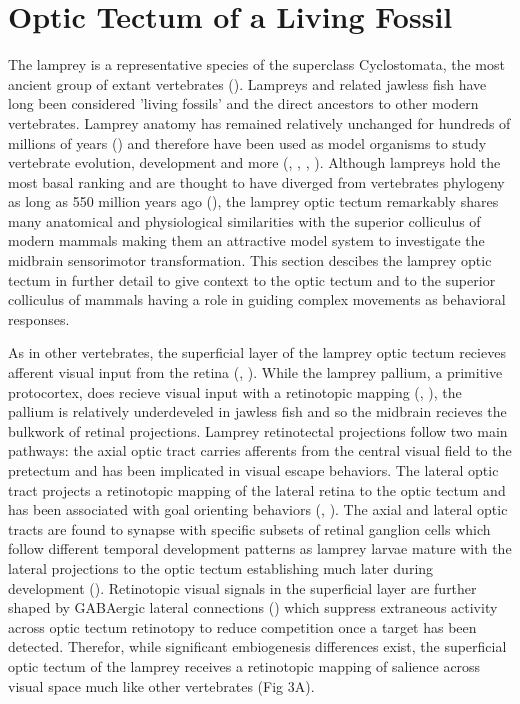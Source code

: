 \documentclass{ar-1col}
\begin{document}
{\section{Optic Tectum of a Living Fossil}
The lamprey is a representative species of the superclass Cyclostomata, the most ancient group of extant vertebrates (\cite{yang2016lamprey}). Lampreys and related jawless fish have long been considered 'living fossils' and the direct ancestors to other modern vertebrates. Lamprey anatomy has remained relatively unchanged for hundreds of millions of years (\cite{gess2006lamprey}) and therefore have been used as model organisms to study vertebrate evolution, development and more (\cite{nikitina2009sea}, \cite{green2014lamprey}, \cite{mccauley2015lampreys}, \cite{yang2016lamprey}). Although lampreys hold the most basal ranking and are thought to have diverged from vertebrates phylogeny as long as 550 million years ago (\cite{kumar1998molecular}), the lamprey optic tectum remarkably shares many anatomical and physiological similarities with the superior colliculus of modern mammals making them an attractive model system to investigate the midbrain sensorimotor transformation. This section descibes the lamprey optic tectum in further detail to give context to the optic tectum and to the superior colliculus of mammals having a role in guiding complex movements as behavioral responses.

As in other vertebrates, the superficial layer of the lamprey optic tectum recieves afferent visual input from the retina (\cite{kosareva1980retinal}, \cite{kennedy1977retinal}). While the lamprey pallium, a primitive protocortex, does recieve visual input with a retinotopic mapping (\cite{suryanarayana2017lamprey}, \cite{suryanarayana2020evolutionary}), the pallium is relatively underdeveled in jawless fish and so the midbrain recieves the bulkwork of retinal projections. Lamprey retinotectal projections follow two main pathways: the axial optic tract carries afferents from the central visual field to the pretectum and has been implicated in visual escape behaviors. The lateral optic tract projects a retinotopic mapping of the lateral retina to the optic tectum and has been associated with goal orienting behaviors (\cite{jones2009selective}, \cite{cornide2011retinotopy}). The axial and lateral optic tracts are found to synapse with specific subsets of retinal ganglion cells which follow different temporal development patterns as lamprey larvae mature with the lateral projections to the optic tectum establishing much later during development (\cite{cornide2011retinotopy}). Retinotopic visual signals in the superficial layer are further shaped by GABAergic lateral connections (\cite{kardamakis2015tectal}) which suppress extraneous activity across optic tectum retinotopy to reduce competition once a target has been detected. Therefor, while significant embiogenesis differences exist, the superficial optic tectum of the lamprey receives a retinotopic mapping of salience across visual space much like other vertebrates (Fig 3A).

}
\end{document}
